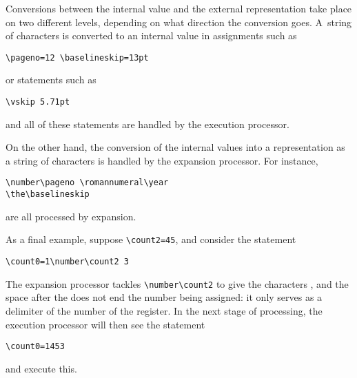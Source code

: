 \documentclass[letterpaper]{book}
\begin{document}
Conversions between the internal value and the external
representation take place on two different levels,
depending on what direction the conversion goes.
A~string of characters is converted to an internal
value in assignments such as
\begin{verbatim}
\pageno=12 \baselineskip=13pt
\end{verbatim}
or statements such as
\begin{verbatim}
\vskip 5.71pt
\end{verbatim}
and all of these statements are handled by the execution
processor.

On the other hand, the conversion of the internal
values into a representation as a string of
characters is handled by the expansion processor.
For instance, \begin{verbatim}
\number\pageno \romannumeral\year
\the\baselineskip
\end{verbatim}
are all processed by expansion.

As a final example, suppose \verb>\count2=45>, and
consider the statement
\begin{verbatim}
\count0=1\number\count2 3
\end{verbatim}
The expansion processor tackles \verb>\number\count2>
to give the characters , and the space after
the  does not end the number being assigned:
it only serves as a delimiter
of the number of the  register.
In the next stage of processing, the execution processor
will then see the statement
\begin{verbatim}
\count0=1453
\end{verbatim}
and execute this.


\endofchapter
\end{document}
